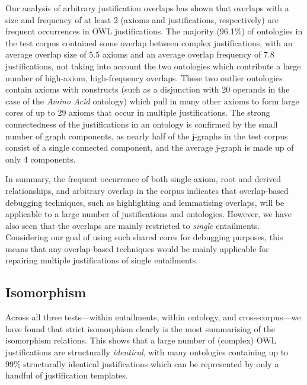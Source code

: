 Our analysis of arbitrary justification overlaps has shown that overlaps with a size and frequency of at least 2 (axioms and justifications, respectively) are frequent occurrences in OWL justifications. The majority (96.1\%) of ontologies in the test corpus contained some overlap between complex justifications, with an average overlap size of 5.5 axioms and an average overlap frequency of 7.8 justifications, not taking into account the two ontologies which contribute a large number of high-axiom, high-frequency overlaps. These two outlier ontologies contain axioms with constructs (such as a disjunction with 20 operands in the case of the \emph{Amino Acid} ontology) which pull in many other axioms to form large cores of up to 29 axioms that occur in multiple justifications. The strong connectedness of the justifications in an ontology is confirmed by the small number of graph components, as nearly half of the j-graphs in the test corpus consist of a single connected component, and the average j-graph is made up of only 4 components.

In summary, the frequent occurrence of both single-axiom, root and derived relationships, and arbitrary overlap in the corpus indicates that overlap-based debugging techniques, such as highlighting and lemmatising overlaps, will be applicable to a large number of justifications and ontologies. However, we have also seen that the overlaps are mainly restricted to \emph{single} entailments. Considering our goal of using such shared cores for debugging purposes, this means that any overlap-based techniques would be mainly applicable for repairing multiple justifications of single entailments.

\subsection{Isomorphism}

Across all three tests---within entailments, within ontology, and cross-corpus---we have found that strict isomorphism clearly is the most summarising of the isomorphism relations. This shows that a large number of (complex) OWL justifications are structurally \emph{identical}, with many ontologies containing up to 99\% structurally identical justifications which can be represented by only a handful of justification templates.

